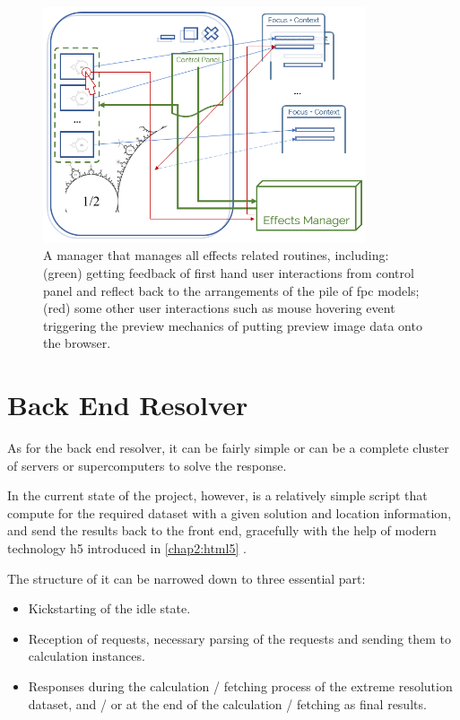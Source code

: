 \begin{figure}[H]
\centering
\includegraphics[width=0.85\textwidth,keepaspectratio]{Figures/Chapter3/effectsmanager.png}
\decoRule
\caption[Manager of Effects]{A manager that manages all effects related routines, including: (green) getting feedback of first hand user interactions from control panel and reflect back to the arrangements of the pile of \gls{fpc} models; (red) some other user interactions such as mouse hovering event triggering the preview mechanics of putting preview image data onto the browser.}
\label{fig:effectsmanager}
\end{figure}


\section{Back End Resolver}

As for the back end resolver, it can be fairly simple or can be a complete cluster of servers or supercomputers to solve the response.

In the current state of the project, however, is a relatively simple script that compute for the required dataset with a given solution and location information, and send the results back to the front end, gracefully with the help of modern technology \gls{h5} introduced in \ref{chap2:html5} .

The structure of it can be narrowed down to three essential part: 

\begin{itemize}
    \item Kickstarting of the idle state.
    \item Reception of requests, necessary parsing of the requests and sending them to calculation instances.
    \item Responses during the calculation / fetching process of the extreme resolution dataset, and / or at the end of the calculation / fetching as final results.
\end{itemize}